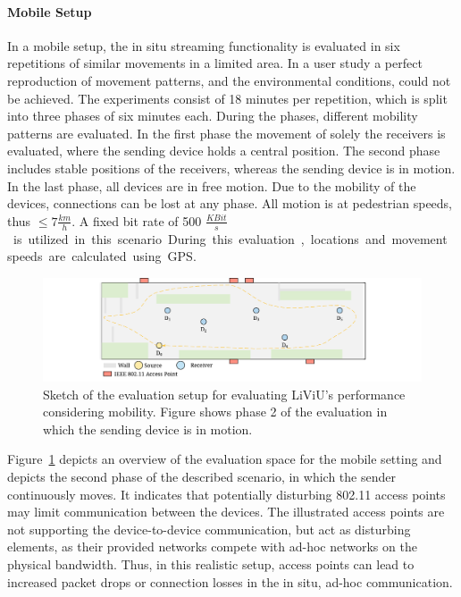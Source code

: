 \paragraph{Mobile Setup}
In a mobile setup, the in situ streaming functionality is evaluated in six repetitions of similar movements in a limited area.
In a user study a perfect reproduction of movement patterns, and the environmental conditions, could not be achieved.
The experiments consist of 18 minutes per repetition, which is split into three phases of six minutes each.
During the phases, different mobility patterns are evaluated.
In the first phase the movement of solely the receivers is evaluated, where the sending device holds a central position.
The second phase includes stable positions of the receivers, whereas the sending device is in motion.
In the last phase, all devices are in free motion.
Due to the mobility of the devices, connections can be lost at any phase.
All motion is at pedestrian speeds, thus $\leq 7 \frac{km}{h}$.
A fixed bit rate of 500 \unit{$\frac{KBit}{s}$} is utilized in this scenario.
During this evaluation, locations and movement speeds are calculated using \ac{GPS}.
\begin{figure}[tbh!]
	\centering
	\includegraphics[width=\linewidth]{gfx/500_MobileUpload/EvalMobileScenario_Sender_Moving}
	\caption[Sketch of the evaluation setup for evaluating LiViU's performance]{Sketch of the evaluation setup for evaluating LiViU's performance considering mobility. Figure shows phase 2 of the evaluation in which the sending device is in motion.}
	\label{fig:530_MobileScenario}
\end{figure}
Figure~\ref{fig:530_MobileScenario} depicts an overview of the evaluation space for the mobile setting and depicts the second phase of the described scenario, in which the sender continuously moves.
It indicates that potentially disturbing 802.11 access points may limit communication between the devices.
The illustrated access points are not supporting the device-to-device communication, but act as disturbing elements, as their provided networks compete with ad-hoc networks on the physical bandwidth.
Thus, in this realistic setup, access points can lead to increased packet drops or connection losses in the in situ, ad-hoc communication.
